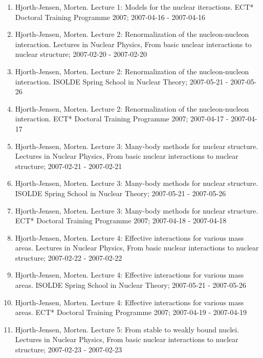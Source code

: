 \documentclass[a4wide,10pt]{article}
\begin{document}
\begin{enumerate}
\item Hjorth-Jensen, Morten.  Lecture 1: Models for the nuclear iteractions. ECT* Doctoral Training Programme 2007; 2007-04-16 - 2007-04-16

\item Hjorth-Jensen, Morten.  Lecture 2: Renormalization of the nucleon-nucleon interaction. Lectures in Nuclear Physics, From basic nuclear interactions to nuclear structure; 2007-02-20 - 2007-02-20

\item Hjorth-Jensen, Morten.  Lecture 2: Renormalization of the nucleon-nucleon interaction. ISOLDE Spring School in Nuclear Theory; 2007-05-21 - 2007-05-26

\item Hjorth-Jensen, Morten.  Lecture 2: Renormalization of the nucleon-nucleon interaction. ECT* Doctoral Training Programme 2007; 2007-04-17 - 2007-04-17

\item Hjorth-Jensen, Morten.  Lecture 3: Many-body methods for nuclear structure. Lectures in Nuclear Physics, From basic nuclear interactions to nuclear structure; 2007-02-21 - 2007-02-21

\item Hjorth-Jensen, Morten.  Lecture 3: Many-body methods for nuclear structure. ISOLDE Spring School in Nuclear Theory; 2007-05-21 - 2007-05-26

\item Hjorth-Jensen, Morten.  Lecture 3: Many-body methods for nuclear structure. ECT* Doctoral Training Programme 2007; 2007-04-18 - 2007-04-18

\item Hjorth-Jensen, Morten.  Lecture 4: Effective interactions for various mass areas. Lectures in Nuclear Physics, From basic nuclear interactions to nuclear structure; 2007-02-22 - 2007-02-22

\item Hjorth-Jensen, Morten.  Lecture 4: Effective interactions for various mass areas. ISOLDE Spring School in Nuclear Theory; 2007-05-21 - 2007-05-26

\item Hjorth-Jensen, Morten.  Lecture 4: Effective interactions for various mass areas. ECT* Doctoral Training Programme 2007; 2007-04-19 - 2007-04-19

\item Hjorth-Jensen, Morten.  Lecture 5: From stable to weakly bound nuclei. Lectures in Nuclear Physics, From basic nuclear interactions to nuclear structure; 2007-02-23 - 2007-02-23


\end{enumerate}
\end{document}
